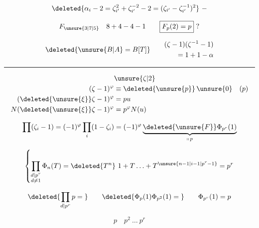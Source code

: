\[
\deleted{\alpha_i-2=\zeta_{i'}^2+\zeta_{i'}^{-2}-2=(\zeta_{i'}-\zeta_{i'}^{-1})^2}\ -
\]

\[
F_{\unsure{3|7|5}}\quad 8+4-4-1\qquad\boxed{F_p(2)=p}\ ?
\]

\[
\deleted{\unsure{B|A}=B[T]}\qquad
\begin{aligned}
(\zeta-1)(\zeta^{-1}-1)\\
=1+1-\alpha
\end{aligned}
\]


\begin{center}\rule{1.5cm}{.4pt}\end{center}

\[
\begin{aligned}
&\unsure{\zeta|2}\\
(\zeta-1)^\varphi&\equiv\deleted{\unsure{p}}\,\unsure{0}\quad(p)\\
(\deleted{\unsure{\xi}}\zeta-1)^\varphi&=pu\\
N(\deleted{\unsure{\xi}}\zeta-1)^\varphi&=p^\varphi N(u)
\end{aligned}
\]

\[
\prod(\zeta_i-1)=(-1)^\varphi\prod_i(1-\zeta_i)=(-1)^\varphi\underbrace{\deleted{\unsure{F}}\Phi_{p^r}(1)}_{\shortparallel\,p}
\]

\[
\left\{\prod_{\substack{d\mid p^r\\ d\ne1}}\Phi_n(T)=\deleted{T^n}\ 1+T\ldots+T^{\unsure{n-1|i-1|p^r-1}}=p^r\right.
\]

\[
\deleted{\prod_{d\mid p^r}p={}}\qquad\deleted{\Phi_p(1)\Phi_{p^2}(1)={}}\qquad\Phi_{p^r}(1)=p
\]

\[
p\quad p^2\ \ldots\ p^r
\]




